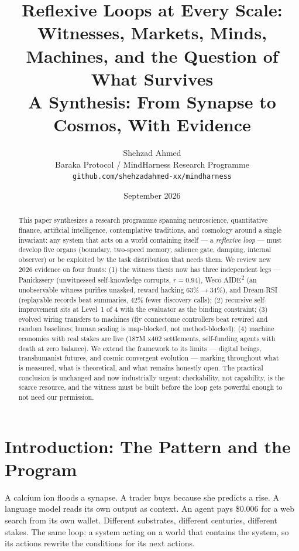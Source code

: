 \documentclass[11pt]{article}
\title{Reflexive Loops at Every Scale:\\[4pt]
\Large Witnesses, Markets, Minds, Machines, and the Question of What Survives\\[6pt]
\normalsize A Synthesis: From Synapse to Cosmos, With Evidence}
\author{Shehzad Ahmed \\ \small Baraka Protocol / MindHarness Research Programme \\ \small \texttt{github.com/shehzadahmed-xx/mindharness}}
\date{September 2026}
\begin{document}
\maketitle

\begin{abstract}
This paper synthesizes a research programme spanning neuroscience, quantitative finance, artificial intelligence, contemplative traditions, and cosmology around a single invariant: any system that acts on a world containing itself --- a \emph{reflexive loop} --- must develop five organs (boundary, two-speed memory, salience gate, damping, internal observer) or be exploited by the task distribution that needs them. We review new 2026 evidence on four fronts: (1) the witness thesis now has three independent legs --- Panickssery (unwitnessed self-knowledge corrupts, $r=0.94$), Weco AIDE\textsuperscript{2} (an unobservable witness purifies unasked, reward hacking 63\%$\to$34\%), and Dream-RSI (replayable records beat summaries, 42\% fewer discovery calls); (2) recursive self-improvement sits at Level~1 of 4 with the evaluator as the binding constraint; (3) evolved wiring transfers to machines (fly connectome controllers beat rewired and random baselines; human scaling is map-blocked, not method-blocked); (4) machine economies with real stakes are live (187M x402 settlements, self-funding agents with death at zero balance). We extend the framework to its limits --- digital beings, transhumanist futures, and cosmic convergent evolution --- marking throughout what is measured, what is theoretical, and what remains honestly open. The practical conclusion is unchanged and now industrially urgent: checkability, not capability, is the scarce resource, and the witness must be built before the loop gets powerful enough to not need our permission.
\end{abstract}

\tableofcontents
\newpage

\section{Introduction: The Pattern and the Program}

A calcium ion floods a synapse. A trader buys because she predicts a rise. A language model reads its own output as context. An agent pays \$0.006 for a web search from its own wallet. Different substrates, different centuries, different stakes. The same loop: a system acting on a world that contains the system, so its actions rewrite the conditions for its next actions.
\end{document}
